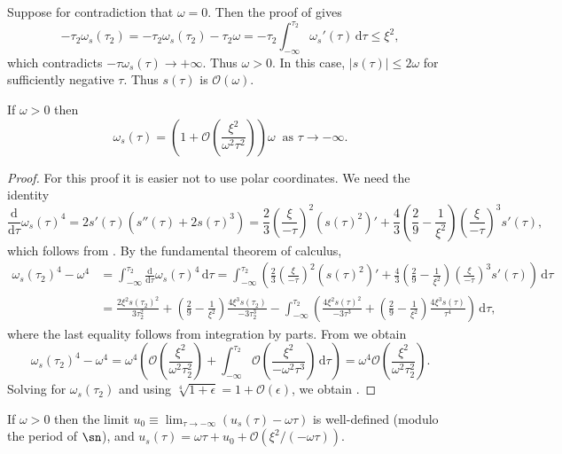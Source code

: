 Suppose for contradiction that $\omega=0$. Then the proof of  gives 
\[
-\tau_{2}\omega_{s}(\tau_{2})=-\tau_{2}\omega_{s}(\tau_{2})-\tau_{2}\omega=-\tau_{2}\int_{-\infty}^{\tau_{2}}\omega_{s}'(\tau)\,\mathrm{d}\tau\leq\xi^{2},
\]
 which contradicts $-\tau\omega_{s}(\tau)\to+\infty$. Thus $\omega>0$. In this case, $\left|s(\tau)\right|\leq2\omega$ for sufficiently negative $\tau$. Thus $s(\tau)$ is $\mathcal{O}(\omega)$. 
\begin{lem}
\label{lem:omega-s-estimate}If $\omega>0$ then 
\begin{equation}
\omega_{s}(\tau)=\left(1+\mathcal{O}\left(\frac{\xi^{2}}{\omega^{2}\tau^{2}}\right)\right)\omega\ \textrm{ as }\tau\to-\infty.\label{eq:omega-quadratic-asymptotic}
\end{equation}
\end{lem}

\begin{proof}
For this proof it is easier not to use polar coordinates. We need the identity 
\[
\frac{\mathrm{d}}{\mathrm{d}\tau}\omega_{s}(\tau)^{4}=2s'(\tau)\left(s''(\tau)+2s(\tau)^{3}\right)=\frac{2}{3}\left(\frac{\xi}{-\tau}\right)^{2}\left(s(\tau)^{2}\right)'+\frac{4}{3}\left(\frac{2}{9}-\frac{1}{\xi^{2}}\right)\left(\frac{\xi}{-\tau}\right)^{3}s'(\tau),
\]
 which follows from . By the fundamental theorem of calculus, 
\begin{align*}
\omega_{s}(\tau_{2})^{4}-\omega^{4} & =\int_{-\infty}^{\tau_{2}}\frac{\mathrm{d}}{\mathrm{d}\tau}\omega_{s}(\tau)^{4}\,\mathrm{d}\tau=\int_{-\infty}^{\tau_{2}}\left(\frac{2}{3}\left(\frac{\xi}{-\tau}\right)^{2}\left(s(\tau)^{2}\right)'+\frac{4}{3}\left(\frac{2}{9}-\frac{1}{\xi^{2}}\right)\left(\frac{\xi}{-\tau}\right)^{3}s'(\tau)\right)\,\mathrm{d}\tau\\
 & =\frac{2\xi^{2}s(\tau_{2})^{2}}{3\tau_{2}^{2}}+\left(\frac{2}{9}-\frac{1}{\xi^{2}}\right)\frac{4\xi^{3}s(\tau_{2})}{-3\tau_{2}^{3}}-\int_{-\infty}^{\tau_{2}}\left(\frac{4\xi^{2}s(\tau)^{2}}{-3\tau{}^{3}}+\left(\frac{2}{9}-\frac{1}{\xi^{2}}\right)\frac{4\xi^{3}s(\tau)}{\tau^{4}}\right)\,\mathrm{d}\tau,
\end{align*}
 where the last equality follows from integration by parts. From  we obtain 
\[
\omega_{s}(\tau_{2})^{4}-\omega^{4}=\omega^{4}\left(\mathcal{O}\left(\frac{\xi^{2}}{\omega^{2}\tau_{2}^{2}}\right)+\int_{-\infty}^{\tau_{2}}\mathcal{O}\left(\frac{\xi^{2}}{-\omega^{2}\tau^{3}}\right)\,\mathrm{d}\tau\right)=\omega^{4}\mathcal{O}\left(\frac{\xi^{2}}{\omega^{2}\tau_{2}^{2}}\right).
\]
 Solving for $\omega_{s}(\tau_{2})$ and using $\sqrt[4]{1+\epsilon}=1+\mathcal{O}\left(\epsilon\right)$, we obtain .  
\end{proof}
\begin{lem}
\label{lem:u0-error}If $\omega>0$ then the limit $u_{0}\equiv\lim_{\tau\to-\infty}\left(u_{s}(\tau)-\omega\tau\right)$ is well-defined (modulo the period of $\sn$), and $u_{s}(\tau)=\omega\tau+u_{0}+\mathcal{O}(\xi^{2}/(-\omega\tau)).$ 
\end{lem}

